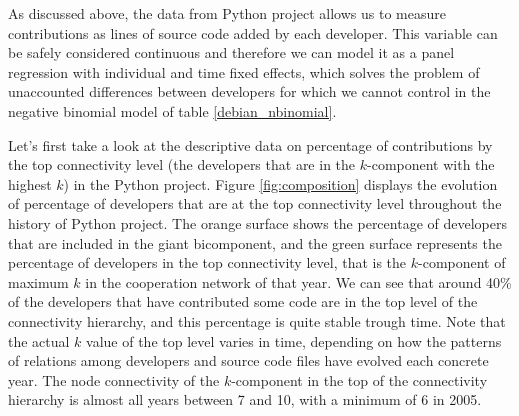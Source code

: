 As discussed above, the data from Python project allows us to measure contributions as lines of source code added by each developer. This variable can be safely considered continuous and therefore we can model it as a panel regression with individual and time fixed effects, which solves the problem of unaccounted differences between developers for which we cannot control in the negative binomial model of table \ref{debian_nbinomial}.
 
Let's first take a look at the descriptive data on percentage of contributions by the top connectivity level (the developers that are in the $k$-component with the highest $k$) in the Python project. Figure \ref{fig:composition} displays the evolution of percentage of developers that are at the top connectivity level throughout the history of Python project. The orange surface shows the percentage of developers that are included in the giant bicomponent, and the green surface represents the percentage of developers in the top connectivity level, that is the $k$-component of maximum $k$ in the cooperation network of that year. We can see that around 40\% of the developers that have contributed some code are in the top level of the connectivity hierarchy, and this percentage is quite stable trough time. Note that the actual $k$ value of the top level varies in time, depending on how the patterns of relations among developers and source code files have evolved each concrete year. The node connectivity of the $k$-component in the top of the connectivity hierarchy is almost all years between 7 and 10, with a minimum of 6 in 2005.

